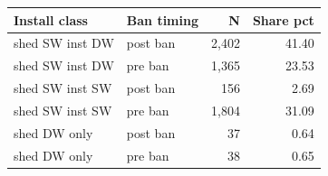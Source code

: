 \begin{tabular}{llrr}
\toprule
Install class & Ban timing & N & Share pct \\
\midrule
shed SW inst DW & post ban & 2,402 & 41.40 \\
shed SW inst DW & pre ban & 1,365 & 23.53 \\
shed SW inst SW & post ban &   156 & 2.69 \\
shed SW inst SW & pre ban & 1,804 & 31.09 \\
shed DW only & post ban &    37 & 0.64 \\
shed DW only & pre ban &    38 & 0.65 \\
\bottomrule
\end{tabular}
